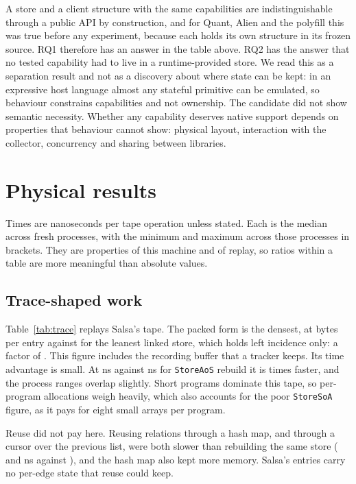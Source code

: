 \documentclass[11pt]{article}
\begin{document}
A store and a client structure with the same capabilities are indistinguishable through a public API by construction, and for Quant, Alien and the polyfill this was true before any experiment, because each holds its own structure in its frozen source. RQ1 therefore has an answer in the table above. RQ2 has the answer that no tested capability had to live in a runtime-provided store. We read this as a separation result and not as a discovery about where state can be kept: in an expressive host language almost any stateful primitive can be emulated, so behaviour constrains capabilities and not ownership. The candidate did not show semantic necessity. Whether any capability deserves native support depends on properties that behaviour cannot show: physical layout, interaction with the collector, concurrency and sharing between libraries.

\section{Physical results}
\label{sec:physical}

Times are nanoseconds per tape operation unless stated. Each is the median across \rustRuns{} fresh processes, with the minimum and maximum across those processes in brackets. They are properties of this machine and of replay, so ratios within a table are more meaningful than absolute values.

\subsection{Trace-shaped work}

Table~\ref{tab:trace} replays Salsa's tape. The packed form is the densest, at \salsaPackedBytes{} bytes per entry against \salsaSplitBytes{} for the leanest linked store, which holds left incidence only: a factor of \salsaDensityRatio{}. This figure includes the recording buffer that a tracker keeps. Its time advantage is small. At \salsaPackedNs{} ns against \salsaAosNs{} ns for \texttt{StoreAoS} rebuild it is \salsaCowlessGain{} times faster, and the process ranges overlap slightly. Short programs dominate this tape, so per-program allocations weigh heavily, which also accounts for the poor \texttt{StoreSoA} figure, as it pays for eight small arrays per program.

Reuse did not pay here. Reusing relations through a hash map, and through a cursor over the previous list, were both slower than rebuilding the same store (\salsaHashNs{} and \salsaAosCursorNs{} ns against \salsaAosNs{}), and the hash map also kept more memory. Salsa's entries carry no per-edge state that reuse could keep.
\end{document}
